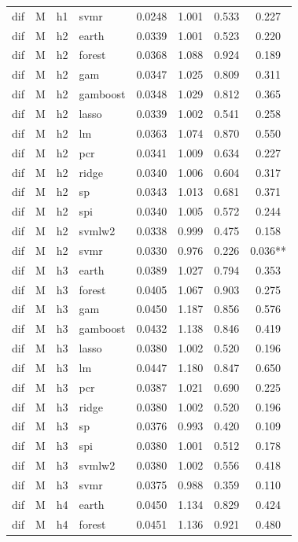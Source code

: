 \begin{ThreePartTable}
\begin{longtable}[t]{llclcccc}
dif & M & h1 & svmr & 0.0248 & 1.001 & 0.533 & 0.227\\
\addlinespace
dif & M & h2 & earth & 0.0339 & 1.001 & 0.523 & 0.220\\
dif & M & h2 & forest & 0.0368 & 1.088 & 0.924 & 0.189\\
dif & M & h2 & gam & 0.0347 & 1.025 & 0.809 & 0.311\\
dif & M & h2 & gamboost & 0.0348 & 1.029 & 0.812 & 0.365\\
dif & M & h2 & lasso & 0.0339 & 1.002 & 0.541 & 0.258\\
dif & M & h2 & lm & 0.0363 & 1.074 & 0.870 & 0.550\\
dif & M & h2 & pcr & 0.0341 & 1.009 & 0.634 & 0.227\\
dif & M & h2 & ridge & 0.0340 & 1.006 & 0.604 & 0.317\\
dif & M & h2 & sp & 0.0343 & 1.013 & 0.681 & 0.371\\
dif & M & h2 & spi & 0.0340 & 1.005 & 0.572 & 0.244\\
dif & M & h2 & svmlw2 & 0.0338 & 0.999 & 0.475 & 0.158\\
dif & M & h2 & svmr & 0.0330 & 0.976 & 0.226 & 0.036**\\
\addlinespace
dif & M & h3 & earth & 0.0389 & 1.027 & 0.794 & 0.353\\
dif & M & h3 & forest & 0.0405 & 1.067 & 0.903 & 0.275\\
dif & M & h3 & gam & 0.0450 & 1.187 & 0.856 & 0.576\\
dif & M & h3 & gamboost & 0.0432 & 1.138 & 0.846 & 0.419\\
dif & M & h3 & lasso & 0.0380 & 1.002 & 0.520 & 0.196\\
dif & M & h3 & lm & 0.0447 & 1.180 & 0.847 & 0.650\\
dif & M & h3 & pcr & 0.0387 & 1.021 & 0.690 & 0.225\\
dif & M & h3 & ridge & 0.0380 & 1.002 & 0.520 & 0.196\\
dif & M & h3 & sp & 0.0376 & 0.993 & 0.420 & 0.109\\
dif & M & h3 & spi & 0.0380 & 1.001 & 0.512 & 0.178\\
dif & M & h3 & svmlw2 & 0.0380 & 1.002 & 0.556 & 0.418\\
dif & M & h3 & svmr & 0.0375 & 0.988 & 0.359 & 0.110\\
\addlinespace
dif & M & h4 & earth & 0.0450 & 1.134 & 0.829 & 0.424\\
dif & M & h4 & forest & 0.0451 & 1.136 & 0.921 & 0.480\\

\end{longtable}
\end{ThreePartTable}
